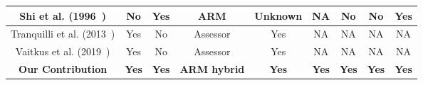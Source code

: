 \begin{landscape}
\begin{table}[htbp]
\begin{adjustwidth}{-2cm}{}
\begin{tabular}{|c|c|c|c|c|c|c|c|c|}
                \hline
                Shi et al. (1996~\cite{shi1996learning})                 & No                     & Yes               & ARM                 & Unknown          & NA                  & No                 & No                & Yes                     \\
                \hline
                Tranquilli et al. (2013~\cite{tranquilli2013definition}) & Yes                    & No                & Assessor            & Yes              & NA                  & NA                 & NA                & NA                      \\
                \hline
                Vaitkus et al. (2019~\cite{vaitkus2019kamst})            & Yes                    & No                & Assessor            & Yes              & NA                  & NA                 & NA                & NA                      \\
                \hline
                \textbf{Our Contribution}                                & \textbf{Yes}           & \textbf{Yes}      & \textbf{ARM hybrid} & \textbf{Yes}     & \textbf{Yes}        & \textbf{Yes}       & \textbf{Yes}      & \textbf{Yes}            \\
                \hline
            \end{tabular}
        \end{adjustwidth}
    \end{table}
\end{landscape}


\clearpage
\changepage{}{}{1.8cm}{1.8cm}{}{}{}{}{}
